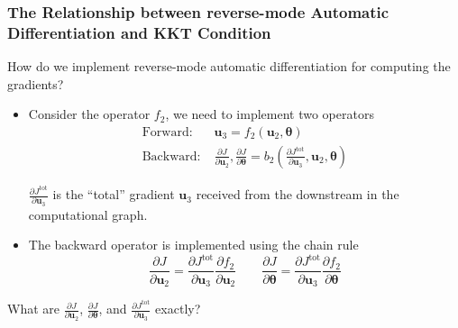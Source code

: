 \documentclass{beamer}
\newcommand{\bt}[0]{\bm{\theta}}
\newcommand{\bu}{\mathbf{u}}
\begin{document}
\begin{frame}
\frametitle{The  Relationship between reverse-mode Automatic Differentiation and KKT Condition}
How do we implement reverse-mode automatic differentiation for computing the gradients? 
\begin{itemize}
	\item Consider the operator $f_2$, we need to implement two operators 
	\begin{align*}
		\mbox{Forward:}&\; \bu_3 = f_2(\bu_2, \bt)\\
		\mbox{Backward:}&\; \frac{\partial J}{\partial \bu_2}, \frac{\partial J}{\partial \bt} = b_2\left(\frac{\partial J^{\mathrm{tot}}}{\partial \bu_3}, \bu_2, \bt\right)
	\end{align*}
	
	$\frac{\partial J^{\mathrm{tot}}}{\partial \bu_3}$ is the ``total'' gradient $\bu_3$ received from the downstream in the computational graph. 
	
\item The backward operator is implemented using the chain rule
\begin{equation*}
	\frac{\partial J}{\partial \bu_2} = \frac{\partial J^{\mathrm{tot}}}{\partial \bu_3} \frac{\partial f_2}{\partial \bu_2}\qquad
	\frac{\partial J}{\partial \bt} = \frac{\partial J^{\mathrm{tot}}}{\partial \bu_3} \frac{\partial f_2}{\partial \bt}
\end{equation*}

	
\end{itemize}

What are $\frac{\partial J}{\partial \bu_2}$, $\frac{\partial J}{\partial \bt}$, and $\frac{\partial J^{\mathrm{tot}}}{\partial \bu_3}$ exactly?

	
\end{frame}
\end{document}
